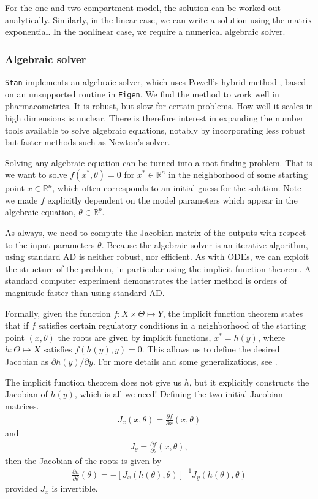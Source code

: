 \documentclass[11pt]{article}
\begin{document}
For the one and two compartment model, the solution can be worked out analytically. Similarly,
in the linear case, we can write a solution using the matrix exponential. In the nonlinear
case, we require a numerical algebraic solver.

\subsubsection{Algebraic solver}

\texttt{Stan} implements an algebraic solver, which uses Powell's hybrid method \cite{Powell:1970},
based on an unsupported routine in \texttt{Eigen}.
We find the method to work well in pharmacometrics.
It is robust, but slow for certain problems.
How well it scales in high dimensions is unclear.
There is therefore interest in expanding the number tools available to solve algebraic equations,
notably by incorporating less robust but faster methods such as Newton's solver.

Solving any algebraic equation can be turned into a root-finding problem. That is we want
to solve $f(x^*, \theta) = 0$ for $x^* \in \mathbb{R}^n$ in the neighborhood of some starting 
point $x \in \mathbb{R}^n$, which often corresponds to an initial guess for the solution. Note we
made $f$ explicitly dependent on the model parameters which appear in the algebraic
equation, $\theta \in \mathbb{R}^p$.

As always, we need to compute the Jacobian matrix of the outputs with respect to the input
parameters $\theta$. Because the algebraic solver is an iterative algorithm,
using standard AD is neither robust, nor efficient.
As with ODEs, we can exploit the structure of the problem, in particular using the implicit function theorem.
A standard computer experiment demonstrates the latter method is orders of magnitude
faster than using standard AD. %

Formally, given the function $f: X \times \Theta \mapsto Y$, the implicit function theorem
states that if $f$ satisfies certain regulatory conditions in a neighborhood of the
starting point $(x, \theta)$ the roots are given by implicit functions, $x^* = h(y)$, where
$h:\Theta \mapsto X$ satisfies $f(h(y), y) = 0$. This allows us to define the desired
Jacobian as $\partial h(y) / \partial y$. For more details and some generalizations,
see \cite{Bell:2008}.

The implicit function theorem does not give us $h$, but it explicitly constructs 
the Jacobian of $h(y)$, which is all we need!
Defining the two initial Jacobian matrices.
%
\begin{eqnarray*}
J_x(x, \theta) = \frac{\partial f}{\partial x} (x, \theta)
\end{eqnarray*}
%
and
%
\begin{eqnarray*}
J_\theta = \frac{\partial f}{\partial \theta} (x, \theta),
\end{eqnarray*}
%
then the Jacobian of the roots is given by
%
\begin{eqnarray*}
\frac{\partial h}{\partial \theta}(\theta) = - [J_x(h(\theta), \theta)]^{-1} J_y(h(\theta), \theta)
\end{eqnarray*}
%
provided $J_x$ is invertible.
\end{document}
